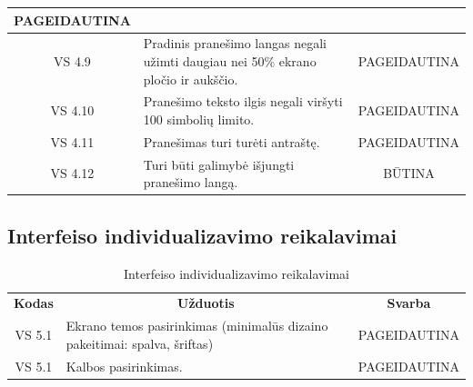\documentclass{VUMIFPSkursinis}
\begin{document}
\begin{center}
\begin{table}[H]
\begin{tabular}{|p{2cm}|p{11cm}|p{2cm}|}
		\multicolumn{1}{|p{1.5cm}|}{PAGEIDAUTINA}\\
	\hline
		\multicolumn{1}{|c|}{VS 4.9}&
		\multicolumn{1}{|p{12,5cm}|}{Pradinis pranešimo langas negali užimti daugiau nei 50\% ekrano pločio ir aukščio.}& 
		\multicolumn{1}{|p{1.5cm}|}{PAGEIDAUTINA}\\
	\hline
		\multicolumn{1}{|c|}{VS 4.10}&
		\multicolumn{1}{|p{12,5cm}|}{Pranešimo teksto ilgis negali viršyti 100 simbolių limito.}& 
		\multicolumn{1}{|p{1.5cm}|}{PAGEIDAUTINA}\\
	\hline
		\multicolumn{1}{|c|}{VS 4.11}&
		\multicolumn{1}{|p{12,5cm}|}{Pranešimas turi turėti antraštę.}& 
		\multicolumn{1}{|p{1.5cm}|}{PAGEIDAUTINA}\\
	\hline
		\multicolumn{1}{|c|}{VS 4.12}&
		\multicolumn{1}{|p{12,5cm}|}{Turi būti galimybė išjungti pranešimo langą.}& 
		\multicolumn{1}{|c|}{BŪTINA}\\
	\hline	 	
	
	\end{tabular}
	
	\label{table:5}
	\end{table}

\end{center}

\pagebreak

\subsection{Interfeiso individualizavimo reikalavimai}

\begin{center}
	\begin{table}[H]
	\caption{Interfeiso individualizavimo reikalavimai}
	\begin{tabular}{|p{2cm}|p{13cm}|p{2cm}|}
	\hline
	    \rowcolor{lightgray}
	    \multicolumn{3}{|c|}{Interfeiso individualizavimo reikalavimai}\\
	\hline
		\multicolumn{1}{|c|}{ {\bfseries Kodas}}&
		\multicolumn{1}{|c|}{ {\bfseries Užduotis}}&
		\multicolumn{1}{|c|}{{\bfseries Svarba}}\\		
	\hline
		\multicolumn{1}{|c|}{VS 5.1}&
		\multicolumn{1}{|p{12,9cm}|}{Ekrano temos pasirinkimas (minimalūs dizaino pakeitimai: spalva, šriftas)}& 
		\multicolumn{1}{|p{1.5cm}|}{PAGEIDAUTINA}\\
	\hline
		\multicolumn{1}{|c|}{VS 5.1}&
		\multicolumn{1}{|p{12,9cm}|}{Kalbos pasirinkimas.}& 
		\multicolumn{1}{|p{1.5cm}|}{PAGEIDAUTINA}\\
	\hline
	
	\end{tabular}
	
	\label{table:6}	
	\end{table}
\end{center}
\end{document}
